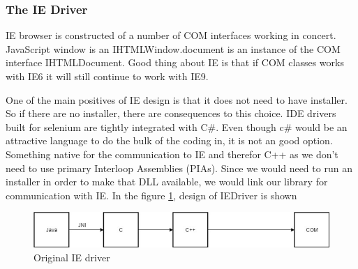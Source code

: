 \documentclass[article,type=msc,colorback,accentcolor=tud9c,twoside,11pt]{tudthesis}
\begin{document}
\subsubsection{The IE Driver}
IE browser is constructed of a number of COM interfaces working in concert. JavaScript window is an IHTMLWindow.document is an instance of the COM interface  IHTMLDocument. Good thing about IE is that if COM classes works with IE6 it will still continue to work with IE9.

One of the main positives of IE design is that it does not need to have installer. So if there are no installer, there are consequences to this choice. IDE drivers built for selenium are tightly integrated with C\#. Even though c\# would be an attractive language to do the bulk of the coding in, it is not an good option. Something native for the communication to IE and therefor C++ as we don't need to use primary Interloop Assemblies (PIAs). Since we would need to run an installer in order to make that DLL available, we would link our library for communication with IE. In the figure  \ref{fig:OriginalIEdriver}, design of IEDriver is shown 
\begin{figure}[h]
	\centering
	\includegraphics[scale=0.6]{OriginalIEdriver}
	\caption{Original IE driver}
	\label{fig:OriginalIEdriver}
\end{figure}
\end{document}

